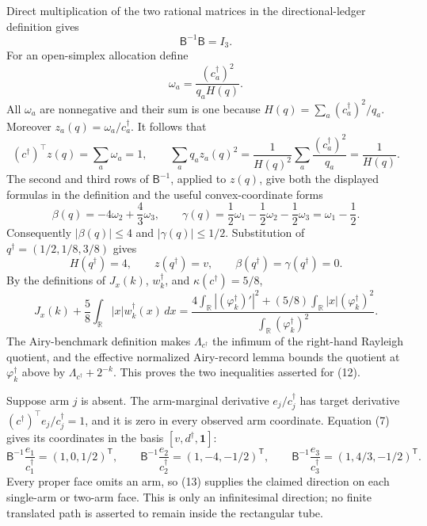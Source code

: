 Direct multiplication of the two rational matrices in the directional-ledger
definition gives
\[
 \mathsf B^{-1}\mathsf B=I_3.
\tag{7}
\]
For an open-simplex allocation define
\[
 \omega_a=\frac{(c_a^\dagger)^2}{q_aH(q)}.
\tag{8}
\]
All \(\omega_a\) are nonnegative and their sum is one because
\(H(q)=\sum_a(c_a^\dagger)^2/q_a\).  Moreover
\(z_a(q)=\omega_a/c_a^\dagger\).  It follows that
\[
 (c^\dagger)^\top z(q)=\sum_a\omega_a=1,
 \qquad
 \sum_aq_az_a(q)^2
 =\frac{1}{H(q)^2}\sum_a\frac{(c_a^\dagger)^2}{q_a}
 =\frac1{H(q)}.
\tag{9}
\]
The second and third rows of \(\mathsf B^{-1}\), applied to \(z(q)\), give both
the displayed formulas in the definition and the useful convex-coordinate forms
\[
 \beta(q)=-4\omega_2+\frac43\omega_3,
 \qquad
 \gamma(q)=\frac12\omega_1-\frac12\omega_2-\frac12\omega_3
 =\omega_1-\frac12.
\tag{10}
\]
Consequently \(|\beta(q)|\le4\) and \(|\gamma(q)|\le1/2\).  Substitution of
\(q^\dagger=(1/2,1/8,3/8)\) gives
\[
 H(q^\dagger)=4,
 \qquad z(q^\dagger)=v,
 \qquad \beta(q^\dagger)=\gamma(q^\dagger)=0.
\tag{11}
\]
By the definitions of \(J_x(k)\), \(w_k^\dagger\), and
\(\kappa(c^\dagger)=5/8\),
\[
 J_x(k)+\frac58\int_{\mathbb R}|x|w_k^\dagger(x)\,dx
 =\frac{4\int_{\mathbb R}|(\varphi_k^\dagger)'|^2
 +(5/8)\int_{\mathbb R}|x|(\varphi_k^\dagger)^2}
 {\int_{\mathbb R}(\varphi_k^\dagger)^2}.
\tag{12}
\]
The Airy-benchmark definition makes \(\Lambda_{c^\dagger}\) the infimum of the
right-hand Rayleigh quotient, and the effective normalized Airy-record lemma bounds
the quotient at \(\varphi_k^\dagger\) above by
\(\Lambda_{c^\dagger}+2^{-k}\).  This proves the two inequalities asserted for
(12).

Suppose arm \(j\) is absent.  The arm-marginal derivative \(e_j/c_j^\dagger\)
has target derivative \((c^\dagger)^\top e_j/c_j^\dagger=1\), and it is zero in
every observed arm coordinate.  Equation (7) gives its coordinates in the basis
\([v,d^\dagger,\mathbf1]\):
\[
 \mathsf B^{-1}\frac{e_1}{c_1^\dagger}=(1,0,1/2)^{\mathsf T},\qquad
 \mathsf B^{-1}\frac{e_2}{c_2^\dagger}=(1,-4,-1/2)^{\mathsf T},\qquad
 \mathsf B^{-1}\frac{e_3}{c_3^\dagger}=(1,4/3,-1/2)^{\mathsf T}.
\tag{13}
\]
Every proper face omits an arm, so (13) supplies the claimed direction on each
single-arm or two-arm face.  This is only an infinitesimal direction; no finite
translated path is asserted to remain inside the rectangular tube.


